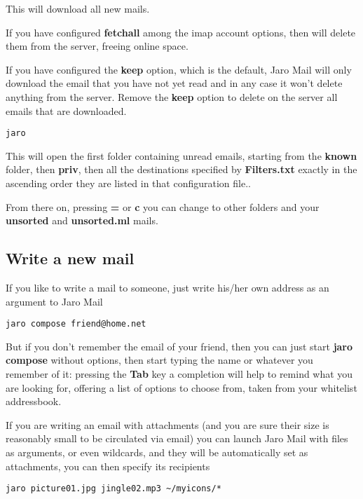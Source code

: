 \documentclass[a4,onecolumn,portrait]{article}
\begin{document}
This will download all new mails.

If you have configured \textbf{fetchall} among the imap account options, then
will delete them from the server, freeing online space.

If you have configured the \textbf{keep} option, which is the default, Jaro Mail will only download the email that you have not yet read and in any case it won't delete anything from the server. Remove the \textbf{keep} option to delete on the server all emails that are downloaded.

\begin{verbatim}
jaro
\end{verbatim}

This will open the first folder containing unread emails, starting from
the \textbf{known} folder, then \textbf{priv}, then all the destinations specified by \textbf{Filters.txt} exactly in the ascending order they are listed in that configuration file..

From there on, pressing \textbf{=} or \textbf{c} you can change to other folders and your \textbf{unsorted} and \textbf{unsorted.ml} mails.
\subsection{Write a new mail}
\label{sec-6-2}

If you like to write a mail to someone, just write his/her own address
as an argument to Jaro Mail

\begin{verbatim}
jaro compose friend@home.net
\end{verbatim}

But if you don't remember the email of your friend, then you can just
start \textbf{jaro compose} without options, then start typing the
name or whatever you remember of it: pressing the \textbf{Tab} key a
completion will help to remind what you are looking for, offering a
list of options to choose from, taken from your whitelist addressbook.

If you are writing an email with attachments (and you are sure their
size is reasonably small to be circulated via email) you can launch
Jaro Mail with files as arguments, or even wildcards, and they will be
automatically set as attachments, you can then specify its recipients

\begin{verbatim}
jaro picture01.jpg jingle02.mp3 ~/myicons/*
\end{verbatim}
\end{document}
